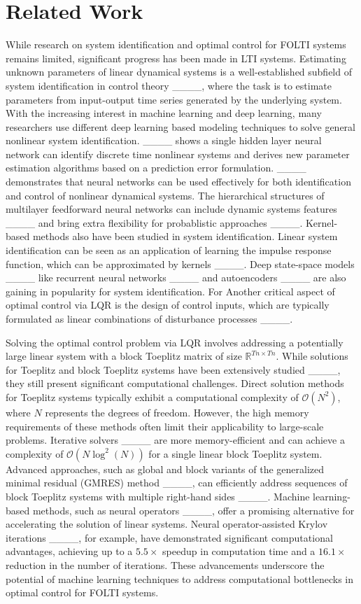 \section{Related Work}
\label{relatedwork}

While research on system identification and optimal control for FOLTI systems remains limited, significant progress has been made in LTI systems. Estimating unknown parameters of linear dynamical systems is a well-established subfield of system identification in control theory ____, where the task is to estimate parameters from input-output time series generated by the underlying system. With the increasing interest in machine learning and deep learning, many researchers use different deep learning based modeling techniques to solve general nonlinear system identification. ____ shows a single hidden layer neural network can identify discrete time nonlinear systems and derives new parameter estimation algorithms based on a prediction error formulation. ____ demonstrates that neural networks can be used effectively for both identification and control of nonlinear dynamical systems. The hierarchical structures of multilayer feedforward neural networks can include dynamic systems features ____ and bring extra flexibility for probablistic approaches ____. Kernel-based methods also have been studied in system identification. Linear system identification can be seen as an application of learning the impulse response function, which can be approximated by kernels ____. Deep state-space models ____ like recurrent neural networks ____ and autoencoders ____ are also gaining in popularity for system identification. For Another critical aspect of optimal control via LQR is the design of control inputs, which are typically formulated as linear combinations of disturbance processes ____.
    
Solving the optimal control problem via LQR involves addressing a potentially large linear system with a block Toeplitz matrix of size $\mathbb{R}^{Tn \times Tn}$. While solutions for Toeplitz and block Toeplitz systems have been extensively studied ____, they still present significant computational challenges. Direct solution methods for Toeplitz systems typically exhibit a computational complexity of $\mathcal{O}(N^2)$, where $N$ represents the degrees of freedom. However, the high memory requirements of these methods often limit their applicability to large-scale problems. Iterative solvers ____ are more memory-efficient and can achieve a complexity of $\mathcal{O}(N \log^2(N))$ for a single linear block Toeplitz system. Advanced approaches, such as global and block variants of the generalized minimal residual (GMRES) method ____, can efficiently address sequences of block Toeplitz systems with multiple right-hand sides ____. Machine learning-based methods, such as neural operators ____, offer a promising alternative for accelerating the solution of linear systems. Neural operator-assisted Krylov iterations ____, for example, have demonstrated significant computational advantages, achieving up to a $5.5\times$ speedup in computation time and a $16.1\times$ reduction in the number of iterations. These advancements underscore the potential of machine learning techniques to address computational bottlenecks in optimal control for FOLTI systems.